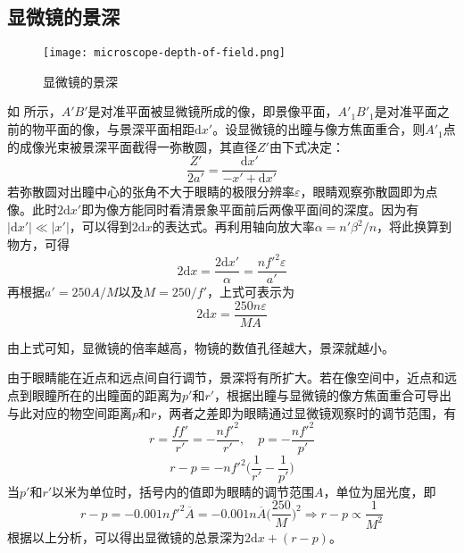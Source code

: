 \documentclass[cn,10pt,chinesefont=founder,math=newtx,cite=super,twoside]{elegantbook}
\begin{document}
\subsection{显微镜的景深}

\begin{figure}[htbp]
	\centering
	\texttt{[image: microscope-depth-of-field.png]}
	\caption{显微镜的景深}
	\label{fig:microscope-depth-of-field}
\end{figure}

如 所示，$A'B'$是对准平面被显微镜所成的像，即景像平面，$A'_1B'_1$是对准平面之前的物平面的像，与景深平面相距$\mathrm{d}x'$。设显微镜的出瞳与像方焦面重合，则$A'_1$点的成像光束被景深平面截得一弥散圆，其直径$Z'$由下式决定：
\begin{equation}
\frac{Z'}{2a'}=\frac{\mathrm{d}x'}{-x'+\mathrm{d}x'}
\end{equation}
若弥散圆对出瞳中心的张角不大于眼睛的极限分辨率$\varepsilon$，眼睛观察弥散圆即为点像。此时$2\mathrm{d}x'$即为像方能同时看清景象平面前后两像平面间的深度。因为有$|\mathrm{d}x'|\ll|x'|$，可以得到$2\mathrm{d}x$的表达式。再利用轴向放大率$\alpha=n'\beta^2/n$，将此换算到物方，可得
\begin{equation}
2\mathrm{d}x=\frac{2\mathrm{d}x'}{\alpha}=\frac{nf'^2\varepsilon}{a'}
\end{equation}
再根据$a'=250A/M$以及$M=250/f'$，上式可表示为
\begin{equation}
2\mathrm{d}x=\frac{250n\varepsilon}{MA}
\end{equation}
\begin{property}
由上式可知，显微镜的倍率越高，物镜的数值孔径越大，景深就越小。
\end{property}

由于眼睛能在近点和远点间自行调节，景深将有所扩大。若在像空间中，近点和远点到眼瞳所在的出瞳面的距离为$p'$和$r'$，根据出瞳与显微镜的像方焦面重合可导出与此对应的物空间距离$p$和$r$，两者之差即为眼睛通过显微镜观察时的调节范围，有
\begin{equation}
r=\frac{ff'}{r'}=-\frac{nf'^2}{r'},\quad p=-\frac{nf'^2}{p'}
\end{equation}
\begin{equation}
r-p=-nf'^2\bigg(\frac{1}{r'}-\frac{1}{p'}\bigg)
\end{equation}
当$p'$和$r'$以米为单位时，括号内的值即为眼睛的调节范围$A$，单位为屈光度，即
\begin{equation}
r-p=-0.001nf'^2\overline{A}=-0.001n\overline{A}\bigg(\frac{250}{M}\bigg)^2\Rightarrow r-p\propto\frac{1}{M^2}
\end{equation}
根据以上分析，可以得出显微镜的总景深为$2\mathrm{d}x+(r-p)$。
\end{document}
